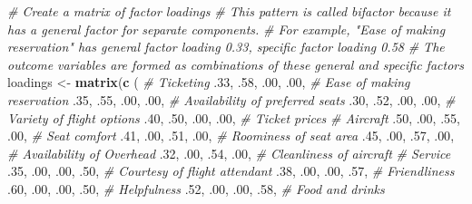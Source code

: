 \documentclass[12pt,]{krantz}
\makeatletter
\newenvironment{Shaded}{\begin{snugshade}}{\end{snugshade}}
\newcommand{\KeywordTok}[1]{\textcolor[rgb]{0.27,0.27,0.27}{\textbf{#1}}}
\newcommand{\DecValTok}[1]{\textcolor[rgb]{0.06,0.06,0.06}{#1}}
\newcommand{\StringTok}[1]{\textcolor[rgb]{0.5,0.5,0.5}{#1}}
\newcommand{\CommentTok}[1]{\textcolor[rgb]{0.37,0.37,0.37}{\textit{#1}}}
\newcommand{\NormalTok}[1]{#1}
\newenvironment{kframe}{%
\medskip{}
\setlength{\fboxsep}{.8em}
 \def\at@end@of@kframe{}%
 \ifinner\ifhmode%
  \def\at@end@of@kframe{\end{minipage}}%
  \begin{minipage}{\columnwidth}%
 \fi\fi%
 \def\FrameCommand##1{\hskip\@totalleftmargin \hskip-\fboxsep
 \colorbox{shadecolor}{##1}\hskip-\fboxsep
     \hskip-\linewidth \hskip-\@totalleftmargin \hskip\columnwidth}%
 \MakeFramed {\advance\hsize-\width
   \@totalleftmargin\z@ \linewidth\hsize
   \@setminipage}}%
 {\par\unskip\endMakeFramed%
 \at@end@of@kframe}
\renewenvironment{Shaded}{\begin{kframe}}{\end{kframe}}
\theoremstyle{definition}
\theoremstyle{definition}
\theoremstyle{definition}
\theoremstyle{remark}
\makeatother
\begin{document}
\begin{Shaded}
\begin{Highlighting}[]
\CommentTok{# Create a matrix of factor loadings}
\CommentTok{# This pattern is called bifactor because it has a general factor for separate components.}
\CommentTok{# For example, "Ease of making reservation" has general factor loading 0.33, specific factor loading 0.58}
\CommentTok{# The outcome variables are formed as combinations of these general and specific factors}
\NormalTok{loadings <-}\StringTok{ }\KeywordTok{matrix}\NormalTok{(}\KeywordTok{c}\NormalTok{ (}
  \CommentTok{# Ticketing}
\NormalTok{  .}\DecValTok{33}\NormalTok{, .}\DecValTok{58}\NormalTok{, .}\DecValTok{00}\NormalTok{, .}\DecValTok{00}\NormalTok{,  }\CommentTok{# Ease of making reservation }
\NormalTok{  .}\DecValTok{35}\NormalTok{, .}\DecValTok{55}\NormalTok{, .}\DecValTok{00}\NormalTok{, .}\DecValTok{00}\NormalTok{,  }\CommentTok{# Availability of preferred seats}
\NormalTok{  .}\DecValTok{30}\NormalTok{, .}\DecValTok{52}\NormalTok{, .}\DecValTok{00}\NormalTok{, .}\DecValTok{00}\NormalTok{,  }\CommentTok{# Variety of flight options}
\NormalTok{  .}\DecValTok{40}\NormalTok{, .}\DecValTok{50}\NormalTok{, .}\DecValTok{00}\NormalTok{, .}\DecValTok{00}\NormalTok{,  }\CommentTok{# Ticket prices}
  \CommentTok{# Aircraft}
\NormalTok{  .}\DecValTok{50}\NormalTok{, .}\DecValTok{00}\NormalTok{, .}\DecValTok{55}\NormalTok{, .}\DecValTok{00}\NormalTok{,  }\CommentTok{# Seat comfort}
\NormalTok{  .}\DecValTok{41}\NormalTok{, .}\DecValTok{00}\NormalTok{, .}\DecValTok{51}\NormalTok{, .}\DecValTok{00}\NormalTok{,  }\CommentTok{# Roominess of seat area}
\NormalTok{  .}\DecValTok{45}\NormalTok{, .}\DecValTok{00}\NormalTok{, .}\DecValTok{57}\NormalTok{, .}\DecValTok{00}\NormalTok{,  }\CommentTok{# Availability of Overhead}
\NormalTok{  .}\DecValTok{32}\NormalTok{, .}\DecValTok{00}\NormalTok{, .}\DecValTok{54}\NormalTok{, .}\DecValTok{00}\NormalTok{,  }\CommentTok{# Cleanliness of aircraft}
  \CommentTok{# Service}
\NormalTok{  .}\DecValTok{35}\NormalTok{, .}\DecValTok{00}\NormalTok{, .}\DecValTok{00}\NormalTok{, .}\DecValTok{50}\NormalTok{,  }\CommentTok{# Courtesy of flight attendant}
\NormalTok{  .}\DecValTok{38}\NormalTok{, .}\DecValTok{00}\NormalTok{, .}\DecValTok{00}\NormalTok{, .}\DecValTok{57}\NormalTok{,  }\CommentTok{# Friendliness}
\NormalTok{  .}\DecValTok{60}\NormalTok{, .}\DecValTok{00}\NormalTok{, .}\DecValTok{00}\NormalTok{, .}\DecValTok{50}\NormalTok{,  }\CommentTok{# Helpfulness}
\NormalTok{  .}\DecValTok{52}\NormalTok{, .}\DecValTok{00}\NormalTok{, .}\DecValTok{00}\NormalTok{, .}\DecValTok{58}\NormalTok{,  }\CommentTok{# Food and drinks}

\end{Highlighting}
\end{Shaded}
\end{document}
